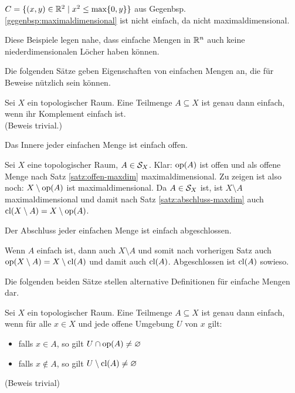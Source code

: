     \begin{gegenbsp}\label{gegenbsp:einfach-2}
        $C = \{(x,y) \in \mathbb{R}^2 \mid x^2 \leq \max\{0,y\}\}$ aus Gegenbsp. \ref{gegenbsp:maximaldimensional} ist nicht einfach, da nicht maximaldimensional.
    \end{gegenbsp}
    Diese Beispiele legen nahe, dass einfache Mengen in $\mathbb{R}^n$ auch keine niederdimensionalen Löcher haben können.
    
    Die folgenden Sätze geben Eigenschaften von einfachen Mengen an, die für Beweise nützlich sein können.
    \begin{satz}\label{satz:einf-komplement}
        Sei $X$ ein topologischer Raum. Eine Teilmenge $A \subseteq X$ ist genau dann einfach, wenn ihr Komplement einfach ist.\\
        (Beweis trivial.)
    \end{satz}
    
    
    \begin{satz}\label{satz:inneres-einf-offen}
        Das Innere jeder einfachen Menge ist einfach offen.
    \end{satz}
    
    \begin{bew}
        Sei $X$ eine topologischer Raum, $A \in \mathcal{S}_X$. 
        Klar: $\text{op}(A)$ ist offen und als offene Menge nach Satz \ref{satz:offen-maxdim} maximaldimensional.
        Zu zeigen ist also noch: $X \setminus \text{op}(A)$ ist maximaldimensional.
        Da $A \in \mathcal{S}_X$ ist, ist $X \setminus A$ maximaldimensional und damit nach Satz \ref{satz:abschluss-maxdim} auch $\text{cl}(X \setminus A) = X \setminus \text{op}(A)$.
    \end{bew}
    
    
    \begin{kor}
        Der Abschluss jeder einfachen Menge ist einfach abgeschlossen.
    \end{kor}
    
    \begin{bew}
        Wenn $A$ einfach ist, dann auch $X \setminus A$ und somit nach vorherigen Satz auch $\text{op}(X \setminus A) = X \setminus \text{cl}(A)$ und damit auch $\text{cl}(A)$. 
        Abgeschlossen ist $\text{cl}(A)$ sowieso.
    \end{bew}


    Die folgenden beiden Sätze stellen alternative Definitionen für einfache Mengen dar.
    \begin{satz}
        Sei $X$ ein topologischer Raum. Eine Teilmenge $A \subseteq X$ ist genau dann einfach, wenn für alle $x \in X$ und jede offene Umgebung $U$ von $x$ gilt:
        \begin{itemize}
            \item falls $x \in A$, so gilt $U \cap \text{op}(A) \neq \varnothing$
            \item falls $x \notin A$, so gilt $U \setminus \text{cl}(A) \neq \varnothing$
        \end{itemize}
        (Beweis trivial)
    \end{satz}



